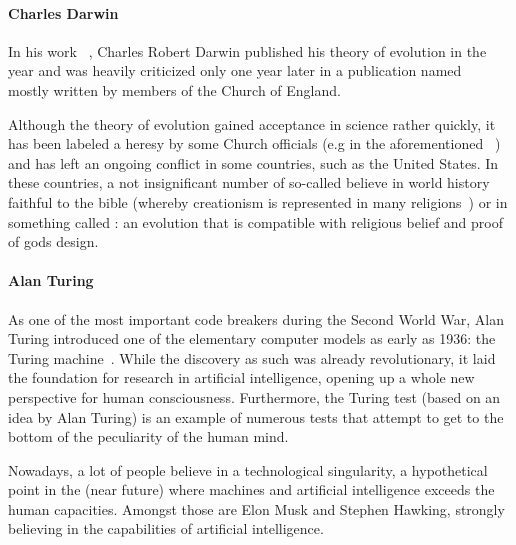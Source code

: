 \paragraph{Charles Darwin} In his work ~\cite{darwin1859origin}, Charles Robert Darwin published
 his theory of evolution in the year \citeyear{darwin1859origin} and was heavily criticized only one year later in a publication named ~\cite{temple1860essays} mostly written by members of the Church of England.

 Although the theory of evolution gained acceptance in science rather quickly, it has been labeled a heresy by some Church officials (e.g in the aforementioned ~\cite{temple1860essays}) and has left an ongoing conflict in some countries, such as the United States.
 In these countries, a not insignificant number of so-called  believe in world history faithful to the bible (whereby creationism is represented in many religions~\cite{Hameed1637}) or in something called : an evolution that is compatible with religious belief and proof of gods design.

\paragraph{Alan Turing} As one of the most important code breakers during the Second World War, Alan Turing introduced one of the elementary computer models as early as 1936: the Turing machine~\cite{turing1936turing}.
While the discovery as such was already revolutionary, it laid the foundation for research in artificial intelligence, opening up a whole new perspective for human consciousness.
Furthermore, the Turing test (based on an idea by Alan Turing) is an example of numerous tests that attempt to get to the bottom of the peculiarity of the human mind.

Nowadays, a lot of people believe in a technological singularity, a hypothetical point in the (near future) where machines and artificial intelligence exceeds the human capacities.
Amongst those are Elon Musk and Stephen Hawking, strongly believing in the capabilities of artificial intelligence.


